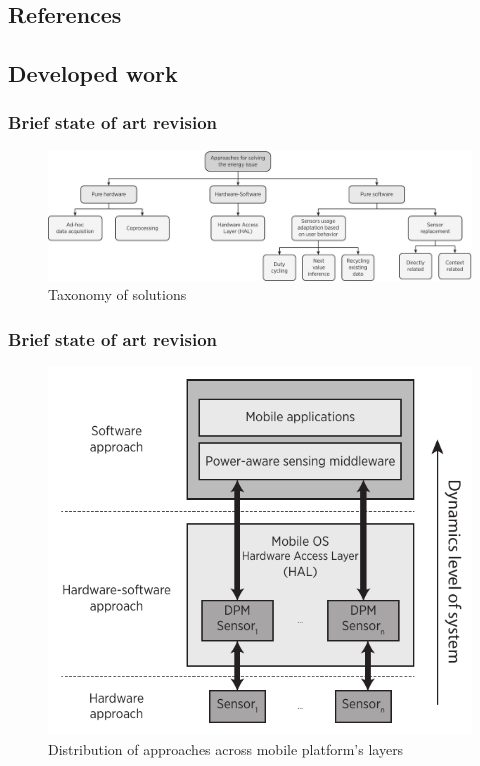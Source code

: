 \documentclass[compress,9pt,xcolor={dvipsnames,table}]{beamer}
\begin{document}
\subsection{References}

% 



\subsection*{Developed work}
\begin{frame}\frametitle{Brief state of art revision}
\begin{figure}[tb]
  \centering
  \includegraphics[width=\textwidth]{../../../resources/images/vectors/approaches-taxonomy}
  \caption{Taxonomy of solutions}
  \label{fig:taxonomy}
\end{figure}
\end{frame}

\begin{frame}\frametitle{Brief state of art revision}
\begin{figure}[tb]
  \centering
  \includegraphics[scale=0.72]{../../../resources/images/vectors/approaches-distribution}
  \caption{Distribution of approaches across mobile platform's layers}
  \label{fig:distribution}
\end{figure}
\end{frame}
\end{document}
